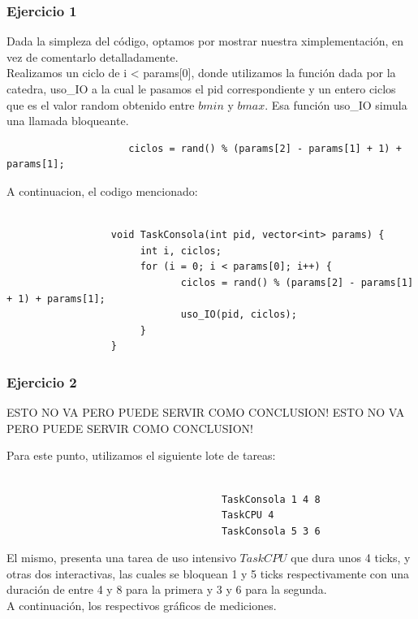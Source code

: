 \subsubsection[Resolución Ejercicio 1]{Ejercicio 1}

\indent Dada la simpleza del código, optamos por mostrar nuestra ximplementación, en vez de comentarlo detalladamente.\\
\indent Realizamos un ciclo de i < params[0], donde utilizamos la función dada por la catedra, uso\_IO a la cual le pasamos
el pid correspondiente y un entero ciclos que es el valor random obtenido entre $bmin$ y $bmax$. Esa función uso\_IO simula una llamada bloqueante.
\begin{center}
 \begin{verbatim}
                     ciclos = rand() % (params[2] - params[1] + 1) + params[1];
 \end{verbatim}

\end{center}

\indent A continuacion, el codigo mencionado:

\begin{verbatim}

                  void TaskConsola(int pid, vector<int> params) {
                       int i, ciclos;              
                       for (i = 0; i < params[0]; i++) {
                              ciclos = rand() % (params[2] - params[1] + 1) + params[1];  
                              uso_IO(pid, ciclos);
                       }
                  } 

\end{verbatim}

\subsubsection[Resolución Ejercicio 2]{Ejercicio 2}

ESTO NO VA PERO PUEDE SERVIR COMO CONCLUSION!
ESTO NO VA PERO PUEDE SERVIR COMO CONCLUSION!

\indent Para este punto, utilizamos el siguiente lote de tareas:
\begin{verbatim}
 
                                     TaskConsola 1 4 8
                                     TaskCPU 4
                                     TaskConsola 5 3 6

\end{verbatim}

\indent El mismo, presenta una tarea de uso intensivo $TaskCPU$ que dura unos 4 ticks, y otras dos interactivas, las cuales se
bloquean 1 y 5 ticks respectivamente con una duración de entre 4 y 8 para la primera y 3 y 6 para la segunda.\\
A continuación, los respectivos gráficos de mediciones.


